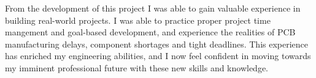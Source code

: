 From the development of this project I was able to gain valuable experience in building real-world projects. I was able to practice proper project time mangement and goal-based development, and experience the realities of PCB manufacturing delays, component shortages and tight deadlines. This experience has enriched my engineering abilities, and I now feel confident in moving towards my imminent professional future with these new skills and knowledge.